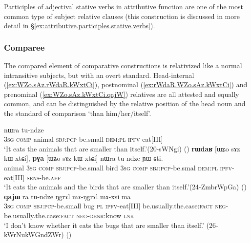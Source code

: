 Participles of adjectival stative verbs in attributive function are one of the most common type of subject relative clauses (this construction is discussed in more detail in §\ref{ex:attributive.participles.stative.verbs}).

\subsubsection{Comparee} \label{comparee.relativization}
The compared element of comparative constructions is relativized like a normal intransitive subjects, but with an overt standard. Head-internal (\ref{ex:WZo.sAz.rWdaR.kWxtCi}), postnominal (\ref{ex:rWdaR.WZo.sAz.kWxtCi}) and prenominal (\ref{ex:WZo.sAz.kWxtCi.qajW}) relatives are all attested and equally common, and can be distinguished by the relative position of the head noun and the standard of comparison  `than him/her/itself'.

\begin{exe}
\ex 
\begin{xlist}
\ex \label{ex:WZo.sAz.rWdaR.kWxtCi}
 nɯra tu-ndze \\
\textsc{3sg} \textsc{comp} animal \textsc{sbj}:\textsc{pcp}-be.small \textsc{dem}:\textsc{pl} \textsc{ipfv}-eat[III] \\
\glt `It eats the animals that are smaller than itself.'(20-sWNgi)
()
\ex \label{ex:rWdaR.WZo.sAz.kWxtCi}
\gll \textbf{rɯdaʁ} [ɯʑo sɤz kɯ-xtɕi], \textbf{pɣa} [ɯʑo sɤz kɯ-xtɕi] nɯra tu-ndze ɲɯ-ɕti. \\
animal \textsc{3sg} \textsc{comp} \textsc{sbj}:\textsc{pcp}-be.small bird \textsc{3sg} \textsc{comp} \textsc{sbj}:\textsc{pcp}-be.smal \textsc{dem}:\textsc{pl} \textsc{ipfv}-eat[III] \textsc{sens}-be.\textsc{aff} \\
\glt `It eats the animals and the birds that are smaller than itself.'(24-ZmbrWpGa)
()
\ex \label{ex:WZo.sAz.kWxtCi.qajW}
 \textbf{qajɯ} ra tu-ndze ŋgrɤl mɤ-ŋgrɤl mɤ-xsi ma \\
\textsc{3sg} \textsc{comp} \textsc{sbj}:\textsc{pcp}-be.small  bug \textsc{pl} \textsc{ipfv}-eat[III] be.usually.the.case:\textsc{fact} \textsc{neg}-be.usually.the.case:\textsc{fact} \textsc{neg}-\textsc{genr}:know \textsc{lnk} \\
\glt `I don't know whether it eats the bugs that are smaller than itself.' (26-kWrNukWGndZWr)
()
\end{xlist}
\end{exe} 


